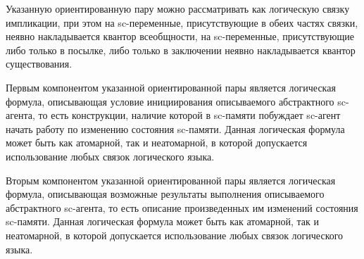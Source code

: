 \begin{SCn}
\begin{scnsubstruct}
\begin{scnindent}
{			Указанную ориентированную пару можно рассматривать как логическую связку импликации, при этом на sc-переменные, присутствующие в обеих частях связки, неявно накладывается квантор всеобщности, на sc-переменные, присутствующие либо только в посылке, либо только в заключении неявно накладывается квантор существования.
			
			Первым компонентом указанной ориентированной пары является логическая формула, описывающая условие инициирования описываемого абстрактного sc-агента, то есть конструкции, наличие которой в sc-памяти побуждает sc-агент начать работу по изменению состояния sc-памяти. Данная логическая формула может быть как атомарной, так и неатомарной, в которой допускается использование любых связок логического языка.
			
			Вторым компонентом указанной ориентированной пары является логическая формула, описывающая возможные результаты выполнения описываемого абстрактного sc-агента, то есть описание произведенных им изменений состояния sc-памяти. Данная логическая формула может быть как атомарной, так и неатомарной, в которой допускается использование любых связок логического языка.}
		\end{scnindent}
		
		\begin{scnsubstruct}
		
			
			

\end{scnsubstruct}
\end{scnsubstruct}
\end{SCn}
